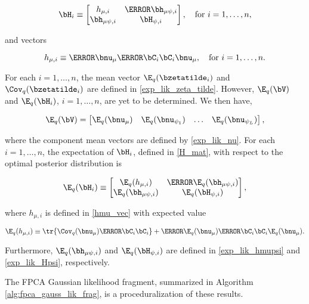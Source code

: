 \documentclass[12pt]{article}
\theoremstyle{plain}
\theoremstyle{definition}
\theoremstyle{remark}
\def\numu{\bnu_\mu}
\newcommand\nupsi[1]{\bnu_{\psi_{#1}}}
\newcommand\hmu[1]{h_{\mu, #1}}
\newcommand\hmupsi[1]{\bh_{\mu \psi, #1}}
\newcommand\Hpsi[1]{\bH_{\psi, #1}}
\begin{document}
\begin{equation}
	\bH_i \equiv \begin{bmatrix}
		\hmu{i} & \T{\hmupsi{i}} \\
		\hmupsi{i} & \Hpsi{i}
	\end{bmatrix}, \quad
	\text{for $i = 1, \dots, n$},
\label{H_mat}
\end{equation}

\noindent and vectors

\begin{equation}
	\hmu{i} \equiv \T{\numu} \T{\bC_i} \bC_i \numu, \quad
	\text{for $i = 1, \dots, n$}.
\label{hmu_vec}
\end{equation}

\noindent For each $i = 1, \dots, n$, the mean vector $\E_q (\bzetatilde_i)$ and $\Cov_q (\bzetatilde_i)$ are defined in
\eqref{exp_lik_zeta_tilde}. However, $\E_q (\bV)$ and $\E_q (\bH_i)$, $i = 1, \dots, n$, are yet to be determined.
We then have,

\[
	\E_q (\bV) = \begin{bmatrix}
		\E_q (\numu) & \E_q (\nupsi{1}) & \dots & \E_q (\nupsi{L})
	\end{bmatrix},
\]

\noindent where the component mean vectors are defined by \eqref{exp_lik_nu}.
For each $i = 1, \dots, n$, the expectation of $\bH_i$, defined in \eqref{H_mat},
with respect to the optimal posterior distribution is

\[
	\E_q (\bH_i) \equiv \begin{bmatrix}
		\E_q (\hmu{i}) & \T{\E_q (\hmupsi{i})} \\
		\E_q (\hmupsi{i}) & \E_q (\Hpsi{i})
	\end{bmatrix},
\]

\noindent where $\hmu{i}$ is defined in \eqref{hmu_vec} with expected value

\[
	\E_q (\hmu{i}) \equiv
		\tr \{ \Cov_q (\numu) \T{\bC_i} \bC_i \}
		+ \T{\E_q (\numu)} \T{\bC_i} \bC_i \E_q (\numu).
\]

\noindent Furthermore, $\E_q (\hmupsi{i})$ and $\E_q (\Hpsi{i})$ are defined in \eqref{exp_lik_hmupsi} and
\eqref{exp_lik_Hpsi}, respectively.

The FPCA Gaussian likelihood fragment, summarized in Algorithm \ref{alg:fpca_gauss_lik_frag}, is a
proceduralization of these results.

\end{document}

